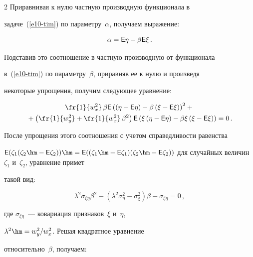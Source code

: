 \begin{multicols}{2}
  Приравнивая к нулю частную производную функционала в

  задаче~(\ref{e10-tim}) по параметру~$\alpha$, получаем выражение:

  $$

  \alpha={\sf E}\eta-\beta {\sf E} \xi\,.

  $$



  Подставив это соотношение в частную производную от функционала

в~(\ref{e10-tim}) по параметру~$\beta$, приравняв ее к нулю и произведя

некоторые упрощения, получим следующее уравнение:

  \begin{multline*}

  \fr{1}{w_x^2}\,\beta {\sf E} \left( \left( \eta- {\sf E}\eta\right) -\beta\left( \xi - {\sf E}\xi\right)

\right)^2 +{}\\

{}+\left( \fr{1}{w_y^2} +\fr{1}{w_x^2}\,\beta^2 \right) {\sf E} \left( \xi \left(

\eta-{\sf E}\eta\right) -\beta \xi\left( \xi-{\sf E}\xi\right) \right) =0\,.

  \end{multline*}

После упрощения этого соотношения с учетом справедливости равенства

${\sf E}(\zeta_1(\zeta_2\hm-{\sf E}\zeta_2))\hm ={\sf E}((\zeta_1\hm-{\sf E}\zeta_1) (\zeta_2\hm-

{\sf E}\zeta_2))$ для случайных величин~$\zeta_1$ и~$\zeta_2$, уравнение примет

такой вид:

\begin{equation}

\lambda^2 \sigma_{\xi\eta}\beta^2 - \left( \lambda^2 \sigma^2_\eta-

\sigma^2_\xi\right) \beta -\sigma_{\xi\eta}=0\,,

\label{e11-tim}

\end{equation}

где $\sigma_{\xi\eta}$~--- ковариация признаков~$\xi$ и~$\eta$,

$\lambda^2\hm=w_y^2/w_x^2$. Решая квадратное уравнение

относительно~$\beta$, получаем:

\begin{multline}


\end{multline}
\end{multicols}
